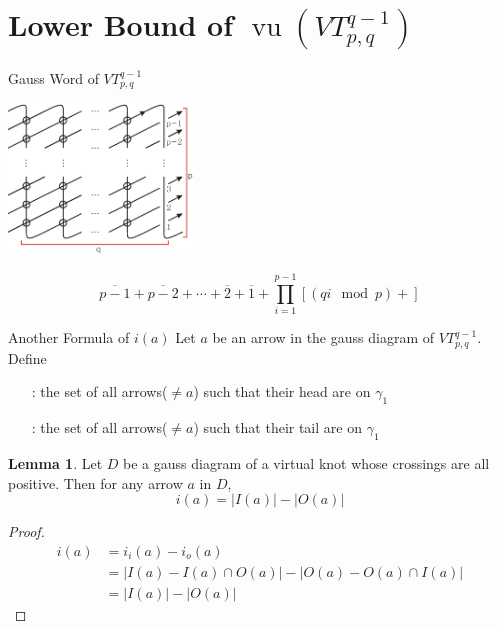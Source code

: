 \documentclass[10pt]{beamer}
\def\vu{\operatorname{vu}}
\def\vt#1#2#3{VT_{#1,#2}^{#3}}
\theoremstyle{definition}
\newtheorem{lem}[thm]{\color{orange}Lemma}
\begin{document}
\section{Lower Bound of $\vu(\vt{p}{q}{q-1})$}

\begin{frame}[fragile]{Gauss Word of $\vt{p}{q}{q-1}$}
\centerline{\includegraphics[height=4cm]{gauss_vt.eps}}
\[
\overline{p-1}+\overline{p-2}+\cdots+\overline{2}+\overline{1}+\prod_{i=1}^{p-1}\left[(qi\mod p)+\right]
\]
\end{frame}


\begin{frame}[fragile]{Another Formula of $i(a)$}
Let $a$ be an arrow in the gauss diagram of $\vt{p}{q}{q-1}$.
Define
\begin{itemize}
\item[\myem{$I(a)$}:] the set of all arrows($\neq a$) such that their head are on $\gamma_1$
\item[\myem{$O(a)$}:] the set of all arrows($\neq a$) such that their tail are on $\gamma_1$
\end{itemize}

\begin{lem}
Let $D$ be a gauss diagram of a virtual knot whose crossings are all positive.
Then for any arrow $a$ in $D$,
\[
i(a) = |I(a)| - |O(a)|
\]
\end{lem}
\vspace{-.5cm}
\begin{proof}
\vspace{-.3cm}
\begin{align*}
i(a) & = i_i(a) - i_o(a)\\
& = |I(a) - I(a)\cap O(a)| - |O(a) - O(a)\cap I(a)|\\
& = |I(a)| - |O(a)|
\end{align*}
\end{proof}
\end{frame}
\end{document}
